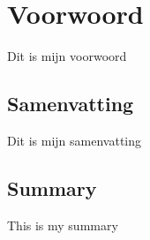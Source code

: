 
\titleformat{\chapter}{\vspace{-1in}}{}{}{\Huge\textbf}
\chapter*{Voorwoord}\thispagestyle{fancy}\vspace{-.35in}

Dit is mijn voorwoord
\newpage

\section*{Samenvatting}
Dit is mijn samenvatting \cite{einstein}
\newpage

\section*{Summary}
This is my summary
\newpage